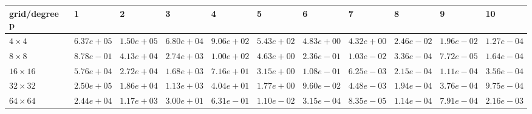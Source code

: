 \begin{tabular}{lllllllllll}
\hline
 grid/degree p   & 1          & 2          & 3          & 4          & 5          & 6          & 7          & 8          & 9          & 10         \\
\hline
 $4 \times 4$    & $6.37e+05$ & $1.50e+05$ & $6.80e+04$ & $9.06e+02$ & $5.43e+02$ & $4.83e+00$ & $4.32e+00$ & $2.46e-02$ & $1.96e-02$ & $1.27e-04$ \\
 $8 \times 8$    & $8.78e-01$ & $4.13e+04$ & $2.74e+03$ & $1.00e+02$ & $4.63e+00$ & $2.36e-01$ & $1.03e-02$ & $3.36e-04$ & $7.72e-05$ & $1.64e-04$ \\
 $16 \times 16$  & $5.76e+04$ & $2.72e+04$ & $1.68e+03$ & $7.16e+01$ & $3.15e+00$ & $1.08e-01$ & $6.25e-03$ & $2.15e-04$ & $1.11e-04$ & $3.56e-04$ \\
 $32 \times 32$  & $2.50e+05$ & $1.86e+04$ & $1.13e+03$ & $4.04e+01$ & $1.77e+00$ & $9.60e-02$ & $4.48e-03$ & $1.94e-04$ & $3.76e-04$ & $9.75e-04$ \\
 $64 \times 64$  & $2.44e+04$ & $1.17e+03$ & $3.00e+01$ & $6.31e-01$ & $1.10e-02$ & $3.15e-04$ & $8.35e-05$ & $1.14e-04$ & $7.91e-04$ & $2.16e-03$ \\
\hline
\end{tabular}
